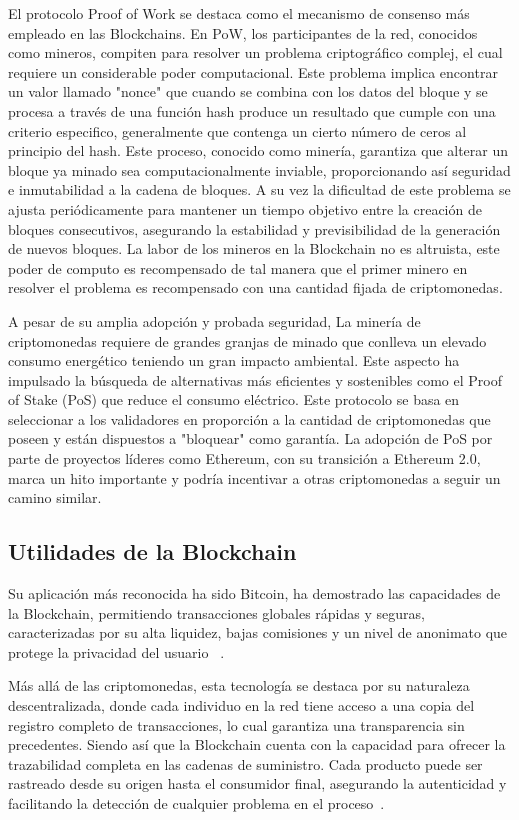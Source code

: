 El protocolo Proof of Work se destaca como el mecanismo de consenso más empleado en las Blockchains. En PoW, los participantes de la red, conocidos como mineros, compiten para resolver un problema criptográfico complej, el cual requiere un considerable poder computacional. Este problema implica encontrar un valor llamado "nonce" que cuando se combina con los datos del bloque y se procesa a través de una función hash produce un resultado que cumple con una criterio especifico, generalmente que contenga un cierto número de ceros al principio del hash.
Este proceso, conocido como minería, garantiza que alterar un bloque ya minado sea computacionalmente inviable, proporcionando así seguridad e inmutabilidad a la cadena de bloques. A su vez la dificultad de este problema se ajusta periódicamente para mantener un tiempo objetivo entre la creación de bloques consecutivos, asegurando la estabilidad y previsibilidad de la generación de nuevos bloques.
La labor de los mineros en la Blockchain no es altruista, este poder de computo es recompensado de tal manera que el primer minero en resolver el problema es recompensado con una cantidad fijada de criptomonedas.

A pesar de su amplia adopción y probada seguridad, La minería de criptomonedas requiere de grandes granjas de minado que conlleva un elevado consumo energético teniendo un gran impacto ambiental. 
Este aspecto ha impulsado la búsqueda de alternativas más eficientes y sostenibles como el Proof of Stake (PoS) que reduce el consumo eléctrico. Este protocolo se basa en seleccionar a los validadores en proporción a la cantidad de criptomonedas que poseen y están dispuestos a "bloquear" como garantía.
La adopción de PoS por parte de proyectos líderes como Ethereum, con su transición a Ethereum 2.0, marca un hito importante y podría incentivar a otras criptomonedas a seguir un camino similar.




\subsection{Utilidades de la Blockchain}

Su aplicación más reconocida ha sido Bitcoin, ha demostrado las capacidades de la Blockchain, permitiendo transacciones globales rápidas y seguras, caracterizadas por su alta liquidez, bajas comisiones y un nivel de anonimato que protege la privacidad del usuario ~\cite{introducciónBitcoin}.

Más allá de las criptomonedas, esta tecnología se destaca por su naturaleza descentralizada, donde cada individuo en la red tiene acceso a una copia del registro completo de transacciones, lo cual garantiza una transparencia sin precedentes. Siendo así que la Blockchain cuenta con la capacidad para ofrecer la trazabilidad completa en las cadenas de suministro. Cada producto puede ser rastreado desde su origen hasta el consumidor final, asegurando la autenticidad y facilitando la detección de cualquier problema en el proceso~\cite{introducciónBlockchain}.

